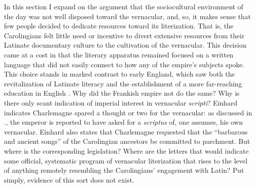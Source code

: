 In this section I expand on the argument that the sociocultural environment of the day was not well disposed toward the vernacular, and, so, it makes sense that few people decided to dedicate resources toward its literization. That is, the Carolingians felt little need or incentive to divert extensive resources from their Latinate documentary culture to the cultivation of the vernacular. This decision came at a cost in that the literary apparatus remained focused on a written language that did not easily connect to how any of the empire’s subjects spoke. This choice stands in marked contrast to early England, which saw both the revitalization of Latinate literacy and the establishment of a more far-reaching education in English \citep[1--2]{Marsden2004}. Why did the Frankish empire not do the same? Why is there only scant indication of imperial interest in vernacular \textit{scripti}? Einhard indicates Charlemagne spared a thought or two for the vernacular: as discussed in ., the emperor is reported to have asked for a \textit{scriptus} of, one assumes, his own vernacular. Einhard also states that Charlemagne requested that the “barbarous and ancient songs” of the Carolingian ancestors be committed to parchment. But where is the corresponding legislation? Where are the letters that would indicate some official, systematic program of vernacular literization that rises to the level of anything remotely resembling the Carolingians’ engagement with Latin? Put simply, evidence of this sort does not exist.

